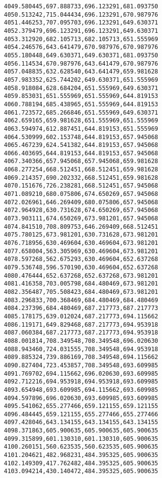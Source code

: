 \documentclass[11pt]{article}
\begin{document}
\begin{Verbatim}[commandchars=\\\{\}]
4049.580445,697.888733,696.123291,681.093750
4050.513242,715.044434,696.123291,670.987976
4051.446253,707.095703,696.123291,649.630371
4052.379479,696.123291,696.123291,649.630371
4053.312920,682.105713,682.105713,651.555969
4054.246576,643.641479,670.987976,670.987976
4055.180448,649.630371,649.630371,681.093750
4056.114534,670.987976,643.641479,670.987976
4057.048835,632.628540,643.641479,659.981628
4057.983352,625.744202,649.630371,651.555969
4058.918084,628.684204,651.555969,649.630371
4059.853031,651.555969,651.555969,644.819153
4060.788194,685.438965,651.555969,644.819153
4061.723572,685.266846,651.555969,649.630371
4062.659165,659.981628,651.555969,651.555969
4063.594974,612.887451,644.819153,651.555969
4064.530999,602.153748,644.819153,657.945068
4065.467239,624.541382,644.819153,657.945068
4066.403695,644.819153,644.819153,657.945068
4067.340366,657.945068,657.945068,659.981628
4068.277254,668.512451,668.512451,659.981628
4069.214357,690.202332,668.512451,659.981628
4070.151676,726.238281,668.512451,657.945068
4071.089210,680.075806,674.650269,657.945068
4072.026961,646.269409,680.075806,657.945068
4072.964928,630.731628,674.650269,657.945068
4073.903111,674.650269,673.981201,657.945068
4074.841510,708.809753,646.269409,668.512451
4075.780125,673.981201,630.731628,673.981201
4076.718956,630.469604,630.469604,673.981201
4077.658004,563.305969,630.469604,673.981201
4078.597268,562.675293,630.469604,652.637268
4079.536748,596.570190,630.469604,652.637268
4080.476444,652.637268,652.637268,673.981201
4081.416358,703.005798,684.480469,673.981201
4082.356487,705.508423,684.480469,673.981201
4083.296833,700.368469,684.480469,684.480469
4084.237396,684.480469,687.217773,687.217773
4085.178175,639.012024,687.217773,694.115662
4086.119171,649.829468,687.217773,694.953918
4087.060384,687.217773,687.217773,694.953918
4088.001814,708.349548,708.349548,696.020630
4088.943460,724.031555,708.349548,694.953918
4089.885324,739.886169,708.349548,694.115662
4090.827404,723.453857,708.349548,693.609985
4091.769702,694.115662,696.020630,693.609985
4092.712216,694.953918,694.953918,693.609985
4093.654948,693.609985,694.115662,693.609985
4094.597896,696.020630,693.609985,693.609985
4095.541062,655.277466,659.121155,659.121155
4096.484445,659.121155,655.277466,655.277466
4097.428046,643.134155,643.134155,643.134155
4098.371863,605.900635,605.900635,605.900635
4099.315899,601.130310,601.130310,605.900635
4100.260151,560.623535,560.623535,605.900635
4101.204621,482.968231,484.395325,605.900635
4102.149309,417.762482,484.395325,605.900635
4103.094214,430.140472,484.395325,605.900635

\end{Verbatim}
\end{document}

